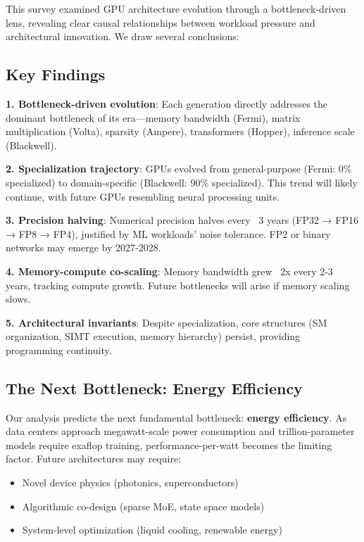 \documentclass{article}
\begin{document}
This survey examined GPU architecture evolution through a bottleneck-driven lens, revealing clear causal relationships between workload pressure and architectural innovation. We draw several conclusions:

\subsection{Key Findings}

\textbf{1. Bottleneck-driven evolution}: Each generation directly addresses the dominant bottleneck of its era—memory bandwidth (Fermi), matrix multiplication (Volta), sparsity (Ampere), transformers (Hopper), inference scale (Blackwell).

\textbf{2. Specialization trajectory}: GPUs evolved from general-purpose (Fermi: 0\% specialized) to domain-specific (Blackwell: 90\% specialized). This trend will likely continue, with future GPUs resembling neural processing units.

\textbf{3. Precision halving}: Numerical precision halves every ~3 years (FP32 → FP16 → FP8 → FP4), justified by ML workloads' noise tolerance. FP2 or binary networks may emerge by 2027-2028.

\textbf{4. Memory-compute co-scaling}: Memory bandwidth grew ~2x every 2-3 years, tracking compute growth. Future bottlenecks will arise if memory scaling slows.

\textbf{5. Architectural invariants}: Despite specialization, core structures (SM organization, SIMT execution, memory hierarchy) persist, providing programming continuity.

\subsection{The Next Bottleneck: Energy Efficiency}

Our analysis predicts the next fundamental bottleneck: \textbf{energy efficiency}. As data centers approach megawatt-scale power consumption and trillion-parameter models require exaflop training, performance-per-watt becomes the limiting factor. Future architectures may require:
\begin{itemize}
\item Novel device physics (photonics, superconductors)
\item Algorithmic co-design (sparse MoE, state space models)
\item System-level optimization (liquid cooling, renewable energy)
\end{itemize}
\end{document}
